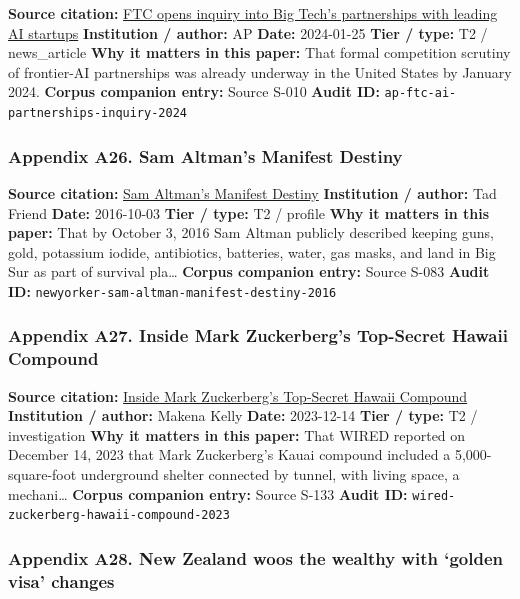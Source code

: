 \documentclass[
  american,
  11pt,
  letterpaper,
]{article}
\begin{document}
\textbf{Source citation:}
\href{https://apnews.com/article/67feef411ef311f0be543f546ef34b3d}{FTC
opens inquiry into Big Tech's partnerships with leading AI startups}
\textbf{Institution / author:} AP \textbf{Date:} 2024-01-25 \textbf{Tier
/ type:} T2 / news\_article \textbf{Why it matters in this paper:} That
formal competition scrutiny of frontier-AI partnerships was already
underway in the United States by January 2024. \textbf{Corpus companion
entry:} Source S-010 \textbf{Audit ID:}
\texttt{ap-ftc-ai-partnerships-inquiry-2024}

\subsubsection{Appendix A26. Sam Altman's Manifest
Destiny}\label{ch-10-appendix-a26-sam-altman-s-manifest-destiny}

\textbf{Source citation:}
\href{https://www.newyorker.com/magazine/2016/10/10/sam-altmans-manifest-destiny}{Sam
Altman's Manifest Destiny} \textbf{Institution / author:} Tad Friend
\textbf{Date:} 2016-10-03 \textbf{Tier / type:} T2 / profile \textbf{Why
it matters in this paper:} That by October 3, 2016 Sam Altman publicly
described keeping guns, gold, potassium iodide, antibiotics, batteries,
water, gas masks, and land in Big Sur as part of survival pla\ldots{}
\textbf{Corpus companion entry:} Source S-083 \textbf{Audit ID:}
\texttt{newyorker-sam-altman-manifest-destiny-2016}

\subsubsection{Appendix A27. Inside Mark Zuckerberg's Top-Secret Hawaii
Compound}\label{ch-10-appendix-a27-inside-mark-zuckerbergs-top-secret-hawaii-compound}

\textbf{Source citation:}
\href{https://www.wired.com/story/mark-zuckerberg-inside-hawaii-compound}{Inside
Mark Zuckerberg's Top-Secret Hawaii Compound} \textbf{Institution /
author:} Makena Kelly \textbf{Date:} 2023-12-14 \textbf{Tier / type:} T2
/ investigation \textbf{Why it matters in this paper:} That WIRED
reported on December 14, 2023 that Mark Zuckerberg's Kauai compound
included a 5,000-square-foot underground shelter connected by tunnel,
with living space, a mechani\ldots{} \textbf{Corpus companion entry:}
Source S-133 \textbf{Audit ID:}
\texttt{wired-zuckerberg-hawaii-compound-2023}

\subsubsection{Appendix A28. New Zealand woos the wealthy with `golden
visa'
changes}\label{ch-10-appendix-a28-new-zealand-woos-the-wealthy-with-golden-visa-changes}
\end{document}
